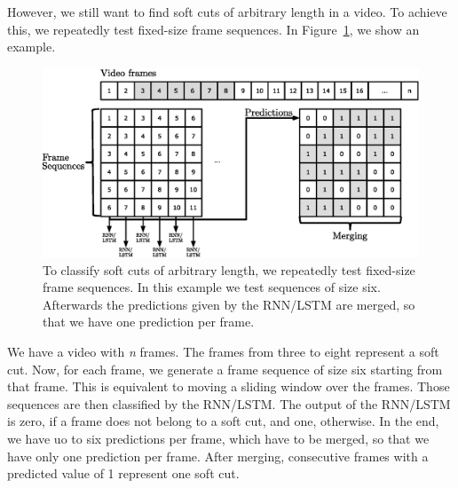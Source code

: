 However, we still want to find soft cuts of arbitrary length in a video.
To achieve this, we repeatedly test fixed-size frame sequences.
In Figure~\ref{fig:soft_cut_approach}, we show an example.
\begin{figure}[!htb]
	\centering
	\includegraphics[scale=.7]{images/soft_cut_approach.eps}
	\caption{To classify soft cuts of arbitrary length, we repeatedly test fixed-size frame sequences. In this example we test sequences of size six. Afterwards the predictions given by the RNN/LSTM are merged, so that we have one prediction per frame.}
	\label{fig:soft_cut_approach}
\end{figure}
We have a video with \textit{n} frames.
The frames from three to eight represent a soft cut.
Now, for each frame, we generate a frame sequence of size six starting from that frame.
This is equivalent to moving a sliding window over the frames.
Those sequences are then classified by the RNN/LSTM.
The output of the RNN/LSTM is zero, if a frame does not belong to a soft cut, and one, otherwise.
In the end, we have uo to six predictions per frame, which have to be merged, so that we have only one prediction per frame.
After merging, consecutive frames with a predicted value of 1 represent one soft cut.

